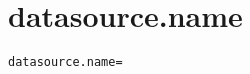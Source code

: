 \section{datasource.name}
\label{configuration:DatasourceName}
\AvailableInJavaOnly{\TODO}
\begin{lstlisting}[style=Props,caption={Usage example for \textit{datasource.name}}]
datasource.name=
\end{lstlisting}